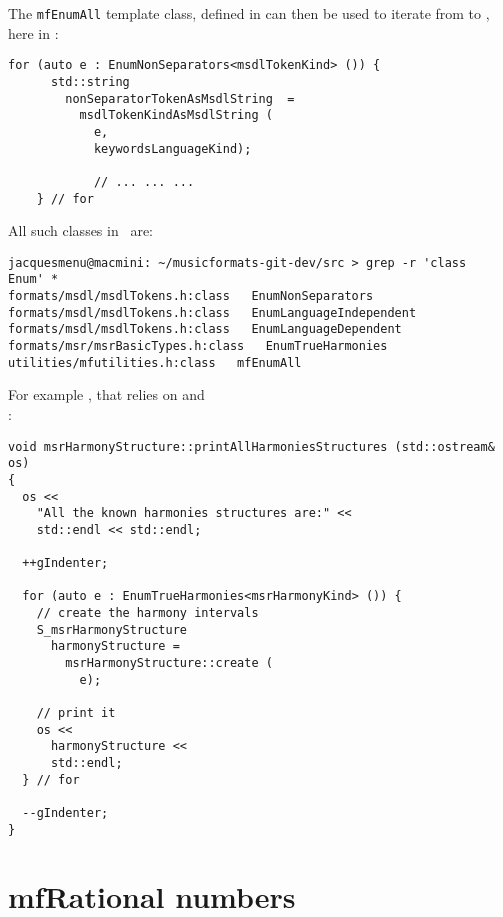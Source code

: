 The {\tt mfEnumAll} template class, defined in  can then be used to iterate from  to , here in :
\begin{lstlisting}[language=CPlusPlus]
    for (auto e : EnumNonSeparators<msdlTokenKind> ()) {
      std::string
        nonSeparatorTokenAsMsdlString  =
          msdlTokenKindAsMsdlString (
            e,
            keywordsLanguageKind);

			// ... ... ...
    } // for
\end{lstlisting}

All such  classes in \mf\ are:
\begin{lstlisting}[language=Terminal]
jacquesmenu@macmini: ~/musicformats-git-dev/src > grep -r 'class   Enum' *
formats/msdl/msdlTokens.h:class   EnumNonSeparators
formats/msdl/msdlTokens.h:class   EnumLanguageIndependent
formats/msdl/msdlTokens.h:class   EnumLanguageDependent
formats/msr/msrBasicTypes.h:class   EnumTrueHarmonies
utilities/mfutilities.h:class   mfEnumAll
\end{lstlisting}

For example , that relies on  and\\
 :
\begin{lstlisting}[language=CPlusPlus]
void msrHarmonyStructure::printAllHarmoniesStructures (std::ostream& os)
{
  os <<
    "All the known harmonies structures are:" <<
    std::endl << std::endl;

  ++gIndenter;

  for (auto e : EnumTrueHarmonies<msrHarmonyKind> ()) {
    // create the harmony intervals
    S_msrHarmonyStructure
      harmonyStructure =
        msrHarmonyStructure::create (
          e);

    // print it
    os <<
      harmonyStructure <<
      std::endl;
  } // for

  --gIndenter;
}
\end{lstlisting}


\section{mfRational numbers}

